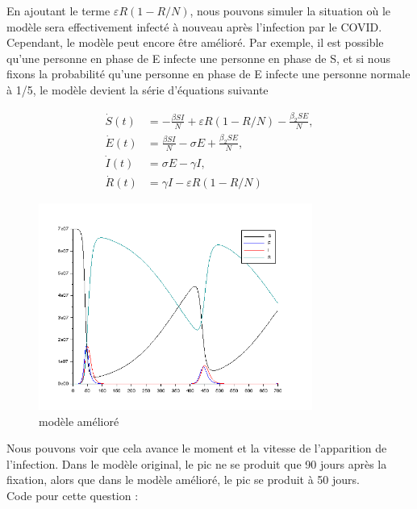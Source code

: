 \documentclass[11pt]{article}
\begin{document}
    En ajoutant le terme $\varepsilon R(1 - R/N )$, nous pouvons simuler la situation où le modèle sera effectivement infecté à nouveau après l'infection par le COVID.
    Cependant, le modèle peut encore être amélioré. Par exemple, il est possible qu'une personne en phase de E infecte une personne en phase de S, et si nous fixons la probabilité qu'une personne en phase de E infecte une personne normale à 1/5, le modèle devient la série d'équations suivante

    \begin{align*}
        \dot{S}(t)&=-\frac{\beta SI}{N} + \varepsilon R(1-R/N) -\frac{\beta_2SE}{N},\\
        \dot{E}(t)&=\frac{\beta SI}{N} -\sigma E + \frac{\beta_2SE}{N},\\
        \dot{I}(t)&=\sigma E - \gamma I,\\
        \dot{R}(t)&=\gamma I - \varepsilon R(1-R/N)
    \end{align*}
    \begin{figure}[H]
        \centering
        \includegraphics[width=0.8\textwidth,height=0.5\textwidth]{aaaa}
        \caption{modèle amélioré}
    \end{figure}
    Nous pouvons voir que cela avance le moment et la vitesse de l'apparition de l'infection. Dans le modèle original, le pic ne se produit que 90 jours après la fixation, alors que dans le modèle amélioré, le pic se produit à 50 jours.
    ~\\
    Code pour cette question :
\end{document}

